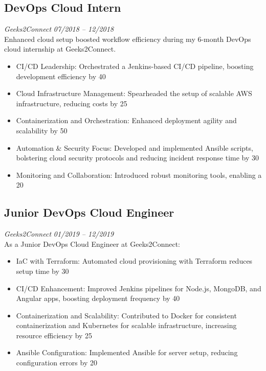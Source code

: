 \documentclass[a4paper,10pt]{article}
\begin{document}
\subsection*{DevOps Cloud Intern}
\textit{Geeks2Connect} \hfill \textit{07/2018 – 12/2018}\\
Enhanced cloud setup boosted workflow efficiency during my 6-month DevOps cloud internship at Geeks2Connect.
\begin{itemize}
    \item CI/CD Leadership: Orchestrated a Jenkins-based CI/CD pipeline, boosting development efficiency by 40%
    \item Cloud Infrastructure Management: Spearheaded the setup of scalable AWS infrastructure, reducing costs by 25%
    \item Containerization and Orchestration: Enhanced deployment agility and scalability by 50%
    \item Automation \& Security Focus: Developed and implemented Ansible scripts, bolstering cloud security protocols and reducing incident response time by 30%
    \item Monitoring and Collaboration: Introduced robust monitoring tools, enabling a 20%
\end{itemize}

\subsection*{Junior DevOps Cloud Engineer}
\textit{Geeks2Connect} \hfill \textit{01/2019 – 12/2019}\\
As a Junior DevOps Cloud Engineer at Geeks2Connect:
\begin{itemize}
    \item IaC with Terraform: Automated cloud provisioning with Terraform reduces setup time by 30%
    \item CI/CD Enhancement: Improved Jenkins pipelines for Node.js, MongoDB, and Angular apps, boosting deployment frequency by 40%
    \item Containerization and Scalability: Contributed to Docker for consistent containerization and Kubernetes for scalable infrastructure, increasing resource efficiency by 25%
    \item Ansible Configuration: Implemented Ansible for server setup, reducing configuration errors by 20%
\end{itemize}
\end{document}
